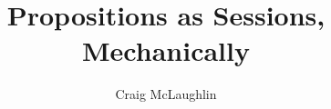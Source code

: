 \documentclass{mpaper}
\begin{document}
\title{Propositions as Sessions, Mechanically}
\author{Craig McLaughlin}

\maketitle









\printbibliography
\end{document}
